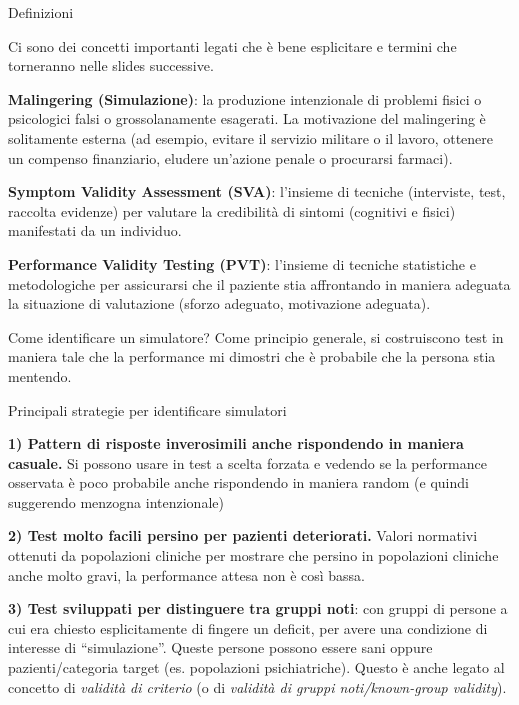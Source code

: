 \documentclass[
  ignorenonframetext,
  aspectratio=169,
]{beamer}
\begin{document}
\begin{frame}{Definizioni}
\label{definizioni}
\small

Ci sono dei concetti importanti legati che è bene esplicitare e termini
che torneranno nelle slides successive.

\textbf{Malingering (Simulazione)}: la produzione intenzionale di
problemi fisici o psicologici falsi o grossolanamente esagerati. La
motivazione del malingering è solitamente esterna (ad esempio, evitare
il servizio militare o il lavoro, ottenere un compenso finanziario,
eludere un'azione penale o procurarsi farmaci).

\textbf{Symptom Validity Assessment (SVA)}: l'insieme di tecniche
(interviste, test, raccolta evidenze) per valutare la credibilità di
sintomi (cognitivi e fisici) manifestati da un individuo.

\textbf{Performance Validity Testing (PVT)}: l'insieme di tecniche
statistiche e metodologiche per assicurarsi che il paziente stia
affrontando in maniera adeguata la situazione di valutazione (sforzo
adeguato, motivazione adeguata).
\end{frame}

\begin{frame}{Come identificare un simulatore?}
\label{come-identificare-un-simulatore}
Come principio generale, si costruiscono test in maniera tale che la
performance mi dimostri che è probabile che la persona stia mentendo.
\end{frame}

\begin{frame}{Principali strategie per identificare simulatori}
\label{principali-strategie-per-identificare-simulatori}
\small

\textbf{1) Pattern di risposte inverosimili anche rispondendo in maniera
casuale.} Si possono usare in test a scelta forzata e vedendo se la
performance osservata è poco probabile anche rispondendo in maniera
random (e quindi suggerendo menzogna intenzionale)

\textbf{2) Test molto facili persino per pazienti deteriorati.} Valori
normativi ottenuti da popolazioni cliniche per mostrare che persino in
popolazioni cliniche anche molto gravi, la performance attesa non è così
bassa.

\textbf{3) Test sviluppati per distinguere tra gruppi noti}: con gruppi
di persone a cui era chiesto esplicitamente di fingere un deficit, per
avere una condizione di interesse di ``simulazione''. Queste persone
possono essere sani oppure pazienti/categoria target (es. popolazioni
psichiatriche). Questo è anche legato al concetto di \emph{validità di
criterio} (o di \emph{validità di gruppi noti/known-group validity}).
\end{frame}
\end{document}
